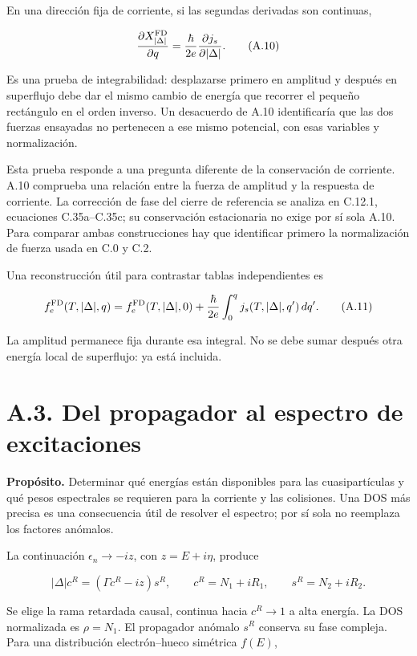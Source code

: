 \documentclass[
  spanish,
  10pt,
  a4paper,
]{article}
\begin{document}
En una dirección fija de corriente, si las segundas derivadas son
continuas,

\[
\frac{\partial X_{|\Delta|}^{\rm FD}}{\partial q}
=\frac{\hbar}{2e}\frac{\partial j_s}{\partial|\Delta|}.
\tag{A.10}
\]

Es una prueba de integrabilidad: desplazarse primero en amplitud y
después en superflujo debe dar el mismo cambio de energía que recorrer
el pequeño rectángulo en el orden inverso. Un desacuerdo de A.10
identificaría que las dos fuerzas ensayadas no pertenecen a ese mismo
potencial, con esas variables y normalización.

Esta prueba responde a una pregunta diferente de la conservación de
corriente. A.10 comprueba una relación entre la fuerza de amplitud y la
respuesta de corriente. La corrección de fase del cierre de referencia
se analiza en C.12.1, ecuaciones C.35a--C.35c; su conservación
estacionaria no exige por sí sola A.10. Para comparar ambas
construcciones hay que identificar primero la normalización de fuerza
usada en C.0 y C.2.

Una reconstrucción útil para contrastar tablas independientes es

\[
f_e^{\rm FD}(T,|\Delta|,q)
=f_e^{\rm FD}(T,|\Delta|,0)
+\frac{\hbar}{2e}\int_0^q j_s(T,|\Delta|,q')\,dq'.
\tag{A.11}
\]

La amplitud permanece fija durante esa integral. No se debe sumar
después otra energía local de superflujo: ya está incluida.

\section{A.3. Del propagador al espectro de
excitaciones}\label{a.3.-del-propagador-al-espectro-de-excitaciones}

\textbf{Propósito.} Determinar qué energías están disponibles para las
cuasipartículas y qué pesos espectrales se requieren para la corriente y
las colisiones. Una DOS más precisa es una consecuencia útil de resolver
el espectro; por sí sola no reemplaza los factores anómalos.

La continuación \(\epsilon_n\to-iz\), con \(z=E+i\eta\), produce

\[
|\Delta|c^R=(\Gamma c^R-iz)s^R,
\qquad c^R=N_1+iR_1,\qquad s^R=N_2+iR_2.
\tag{A.12}
\]

Se elige la rama retardada causal, continua hacia \(c^R\to1\) a alta
energía. La DOS normalizada es \(\rho=N_1\). El propagador anómalo
\(s^R\) conserva su fase compleja. Para una distribución electrón--hueco
simétrica \(f(E)\),
\end{document}
